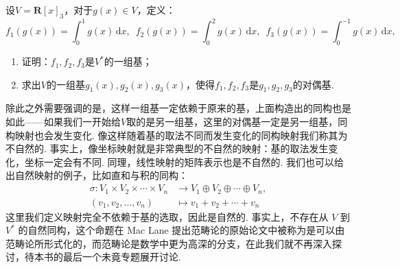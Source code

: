 \begin{example}{}{}
    设$V=\mathbf{R}[x]_3$，对于$g(x)\in V$，定义：
    \[f_1(g(x))=\displaystyle\int_0^1g(x)\,\mathrm{d}x,\enspace f_2(g(x))=\int_0^2g(x)\,\mathrm{d}x,\enspace f_3(g(x))=\int_0^{-1}g(x)\,\mathrm{d}x,\]
    \begin{enumerate}
        \item 证明：$f_1,f_2,f_3$是$V^*$的一组基；

        \item 求出$V$的一组基$g_1(x),g_2(x),g_3(x)$，使得$f_1,f_2,f_3$是$g_1,g_2,g_3$的对偶基.
    \end{enumerate}
\end{example}

\begin{solution}

\end{solution}

除此之外需要强调的是，这样一组基一定依赖于原来的基，上面构造出的同构也是如此——如果我们一开始给$V$取的是另一组基，这里的对偶基一定是另一组基，同构映射也会发生变化. 像这样随着基的取法不同而发生变化的同构映射我们称其为不自然的. 事实上，像坐标映射就是非常典型的不自然的映射：基的取法发生变化，坐标一定会有不同. 同理，线性映射的矩阵表示也是不自然的. 我们也可以给出自然映射的例子，比如直和与积的同构：
\begin{equation}
    \begin{aligned}
        \sigma:V_1\times V_2\times\cdots\times V_n & \to V_1\oplus V_2\oplus\cdots\oplus V_n, \\
        (v_1,v_2,\ldots,v_n)                       & \mapsto v_1+v_2+\cdots+v_n
    \end{aligned}
\end{equation}
这里我们定义映射完全不依赖于基的选取，因此是自然的. 事实上，不存在从 $V$ 到 $V^*$ 的自然同构，这个命题在 Mac Lane 提出范畴论的原始论文中被称为是可以由范畴论所形式化的，而范畴论是数学中更为高深的分支，在此我们就不再深入探讨，待本书的最后一个未竟专题展开讨论.

